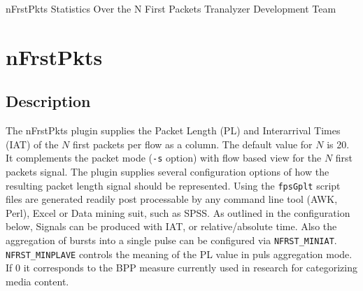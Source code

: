 \documentclass[documentation]{subfiles}
\begin{document}
\trantitle
    {nFrstPkts}
    {Statistics Over the N First Packets}
    {Tranalyzer Development Team} %

\section{nFrstPkts}\label{s:nFrstPkts}

\subsection{Description}
The nFrstPkts plugin supplies the Packet Length (PL) and Interarrival Times (IAT) of the $N$ first packets per flow as a column. The default value for $N$ is 20.
It complements the packet mode ({\tt -s} option) with flow based view for the $N$ first packets signal. The plugin supplies several configuration options of how the
resulting packet length signal should be represented. Using the {\tt fpsGplt} script files are generated readily post processable by any command line tool (AWK, Perl),
Excel or Data mining suit, such as SPSS. As outlined in the configuration below, Signals can be produced with IAT, or relative/absolute time. Also the
aggregation of bursts into a single pulse can be configured via {\tt NFRST\_MINIAT}. {\tt NFRST\_MINPLAVE} controls the meaning of the PL value in puls aggregation
mode. If 0 it corresponds to the BPP measure currently used in research for categorizing media content.
\end{document}

